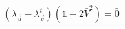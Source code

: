 \begin{multicols}{3}
  \begin{equation}
    \label{eq:flipping-constraint}
    \left(\lambda_{\vec{u}} - \lambda_{\vec{v}}^t\right)\left(\mathds{1} - 2\bar{V}^2\right) = \bar{0} 
  \end{equation}
    

\end{multicols}


